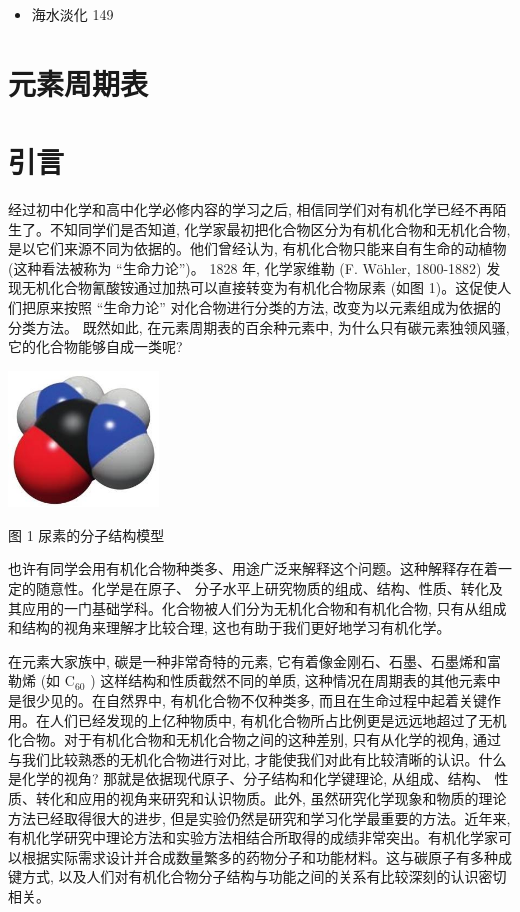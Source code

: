 \documentclass[10pt]{article}
\begin{document}
\begin{itemize}
\item 海水淡化 149
\end{itemize}

\section*{元素周期表}

\section*{引言}

经过初中化学和高中化学必修内容的学习之后, 相信同学们对有机化学已经不再陌生了。不知同学们是否知道, 化学家最初把化合物区分为有机化合物和无机化合物, 是以它们来源不同为依据的。他们曾经认为, 有机化合物只能来自有生命的动植物 (这种看法被称为 “生命力论”)。 1828 年, 化学家维勒 (F. Wöhler, 1800-1882) 发现无机化合物氰酸铵通过加热可以直接转变为有机化合物尿素 (如图 1)。这促使人们把原来按照 “生命力论” 对化合物进行分类的方法, 改变为以元素组成为依据的分类方法。 既然如此, 在元素周期表的百余种元素中, 为什么只有碳元素独领风骚, 它的化合物能够自成一类呢?

\begin{center}
\includegraphics[max width=0.3\textwidth]{images/0190efc5-b58a-7c43-bfb0-e0a030df9cfd_6_253987.jpg}
\end{center}

图 1 尿素的分子结构模型

也许有同学会用有机化合物种类多、用途广泛来解释这个问题。这种解释存在着一定的随意性。化学是在原子、 分子水平上研究物质的组成、结构、性质、转化及其应用的一门基础学科。化合物被人们分为无机化合物和有机化合物, 只有从组成和结构的视角来理解才比较合理, 这也有助于我们更好地学习有机化学。

在元素大家族中, 碳是一种非常奇特的元素, 它有着像金刚石、石墨、石墨烯和富勒烯 (如 \({\mathrm{C}}_{60}\) ) 这样结构和性质截然不同的单质, 这种情况在周期表的其他元素中是很少见的。在自然界中, 有机化合物不仅种类多, 而且在生命过程中起着关键作用。在人们已经发现的上亿种物质中, 有机化合物所占比例更是远远地超过了无机化合物。对于有机化合物和无机化合物之间的这种差别, 只有从化学的视角, 通过与我们比较熟悉的无机化合物进行对比, 才能使我们对此有比较清晰的认识。什么是化学的视角? 那就是依据现代原子、分子结构和化学键理论, 从组成、结构、 性质、转化和应用的视角来研究和认识物质。此外, 虽然研究化学现象和物质的理论方法已经取得很大的进步, 但是实验仍然是研究和学习化学最重要的方法。近年来, 有机化学研究中理论方法和实验方法相结合所取得的成绩非常突出。有机化学家可以根据实际需求设计并合成数量繁多的药物分子和功能材料。这与碳原子有多种成键方式, 以及人们对有机化合物分子结构与功能之间的关系有比较深刻的认识密切相关。
\end{document}
